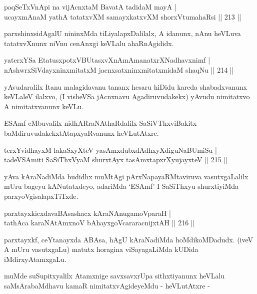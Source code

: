 \begin{shl}
paqSeTxVnApi na vijAcnxtaM BavatA tadidaM mayA |\\
ucayxmAnaM yathA tatatxvXM samayxkatxvXM shorxVtumahaRsi \hfill || 213 ||
\end{shl}

\begin{artha}
parxshinxsidAgalU nininxMda tiLiyalapxDalilalx, A idanunx, nAnu heVLuva tatatxvXnunx niVnu cenAnxgi keVLalu ahaRnAgididx.
\end{artha}


\begin{shl}
yaterxYSa EtatusxpotxV\s BUtasxvXnAmAmanatxrXNadhavxnimf |\\
nAshwrxSiVdayxninxmitatxM jacnxsatxninxmitatxmidaM shaqNu \hfill || 214 ||
\end{shl}

\begin{artha}
yAvudaralilx Itanu malagidavanu tananx hesaru hiDidu kareda shabadxvanunx keVLaleV ilalxvo, (I visheVSa jAcnxnavu Agadiruvudakekx) yAvudu nimitatxvo A nimitatxvanunx keVLu.
\end{artha}

\begin{artha}
ESAmf eMbuvalilx nidhARraNAthaRdalilx SaSiVThxviBakitx baMdiruvudakekx\break tAtapxyaRvanunx heVLutAtxre.
\end{artha}

\begin{shl}
terxYvidhayxM lakaSxyXteV yasAmxdubxdAdhxyXdiguNaBUmiSu |\\
tadeVSAmiti SaSiThxVyaM shurxtAyx tasAmxtapxrXyujayxteV \hfill || 215 ||
\end{shl}

\begin{artha}
yAva kAraNadiMda budidhx muMtAgi pArxNapayaRMtaviruva vasutxgaLalilx mUru bageyu kANutatxdeyo, adariMda `ESAmf' I SaSiThxyu shurxtiyiMda parxyoVgisalapxTiTxde.
\end{artha}

\begin{shl}
parxtayxkicxdavaBAsashacx kAraNAnugamoV\s paraH |\\
tathAca karaNAtAmxnoV bAhayxgoVcararacnijxtAH \hfill || 216 ||
\end{shl}

\begin{artha}
parxtayxkf, ceYtanayxda ABAsa, hAgU kAraNadiMda hoMdikoMDadudx. (iveV A mUru vasutxgaLu) matutx horagina viSayagaLiMda kUDida iMdirxyAtamxgaLu. 
\end{artha}
\begin{artha}
muMde suSupitxyalilx Atamxnige savxsavxrUpa sithxtiyanunx heVLalu saMsArabaMdhavu kamaR nimitatxvAgideyeMdu - heVLutAtxre -
\end{artha}

